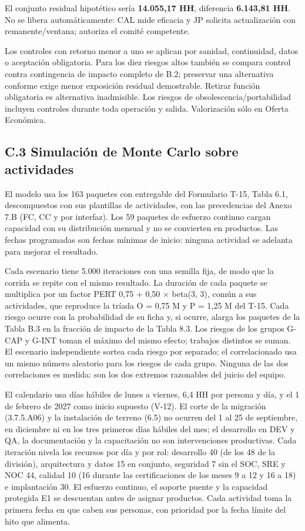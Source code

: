 El conjunto residual hipotético sería \textbf{14.055,17 HH}, diferencia \textbf{6.143,81 HH}. No se libera automáticamente: CAL mide eficacia y JP solicita actualización con remanente/ventana; autoriza el comité competente.

Los controles con retorno menor a uno se aplican por sanidad, continuidad, datos o aceptación obligatoria. Para los diez riesgos altos también se compara control contra contingencia de impacto completo de B.2; preservar una alternativa conforme exige menor exposición residual demostrable. Retirar función obligatoria es alternativa inadmisible. Los riesgos de obsolescencia/portabilidad incluyen controles durante toda operación y salida. Valorización sólo en Oferta Económica.

\subsection*{C.3 Simulación de Monte Carlo sobre actividades}

El modelo usa los 163 paquetes con entregable del Formulario T-15, Tabla 6.1, descompuestos con sus plantillas de actividades, con las precedencias del Anexo 7.B (FC, CC y por interfaz). Los 59 paquetes de esfuerzo continuo cargan capacidad con su distribución mensual y no se convierten en productos. Las fechas programadas son fechas mínimas de inicio: ninguna actividad se adelanta para mejorar el resultado.

Cada escenario tiene 5.000 iteraciones con una semilla fija, de modo que la corrida se repite con el mismo resultado. La duración de cada paquete se multiplica por un factor PERT 0,75 + 0,50 \ensuremath{\times} beta(3, 3), común a sus actividades, que reproduce la tríada O = 0,75 M y P = 1,25 M del T-15. Cada riesgo ocurre con la probabilidad de su ficha y, si ocurre, alarga los paquetes de la Tabla B.3 en la fracción de impacto de la Tabla 8.3. Los riesgos de los grupos G-CAP y G-INT toman el máximo del mismo efecto; trabajos distintos se suman. El escenario independiente sortea cada riesgo por separado; el correlacionado usa un mismo número aleatorio para los riesgos de cada grupo. Ninguna de las dos correlaciones es medida: son los dos extremos razonables del juicio del equipo.

El calendario usa días hábiles de lunes a viernes, 6,4 HH por persona y día, y el 1 de febrero de 2027 como inicio supuesto (V-12). El corte de la migración (3.7.5.A06) y la instalación de terreno (6.5) no ocurren del 1 al 25 de septiembre, en diciembre ni en los tres primeros días hábiles del mes; el desarrollo en DEV y QA, la documentación y la capacitación no son intervenciones productivas. Cada iteración nivela los recursos por día y por rol: desarrollo 40 (de los 48 de la división), arquitectura y datos 15 en conjunto, seguridad 7 sin el SOC, SRE y NOC 44, calidad 10 (16 durante las certificaciones de los meses 9 a 12 y 16 a 18) e implantación 30. El esfuerzo continuo, el soporte puente y la capacidad protegida E1 se descuentan antes de asignar productos. Cada actividad toma la primera fecha en que caben sus personas, con prioridad por la fecha límite del hito que alimenta.

